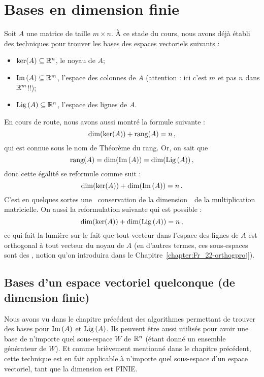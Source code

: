 \chapter{Bases en dimension finie}

\label{chapter:Fr_19-wrapupbases}

Soit $A$ une matrice de taille $m\times n$.
\`A ce stade du cours, nous avons déjà établi des techniques pour trouver les bases des espaces vectoriels suivants :
\begin{itemize}
\item $\ker(A)\subseteq \mathbb{R}^n$, le noyau de $A$;
\item $\operatorname{Im}\,(A)\subseteq \mathbb{R}^m$, l'espace des colonnes de $A$ (attention : ici c'est $m$ et pas $n$ dans $\mathbb{R}^m$!\!!);
\item $\operatorname{Lig\,}(A)\subseteq \mathbb{R}^n$, l'espace des lignes de $A$.
\end{itemize}
En cours de route, nous avons aussi montré la formule suivante : 
$$
\dim(\ker(A)) + \textrm{rang}(A) = n\,,
$$
qui est connue sous le nom de Théorème du rang.  Or, on sait que $$\textrm{rang}(A) = \dim(\operatorname{Im}\,(A)) = \dim(\operatorname{Lig\,}(A))\,,$$ donc cette égalité se reformule comme suit :
$$
\dim(\ker(A)) + \dim(\operatorname{Im}\,(A)) = n\,.  
$$
C'est en quelques sortes une \og\ conservation de la dimension\ \fg\ de la multiplication matricielle. On aussi la reformulation suivante qui est possible :
$$
 \dim(\ker(A)) + \dim(\operatorname{Lig\,}(A)) = n\,,
$$
ce qui fait la lumière sur le fait que tout vecteur dans l'espace des lignes de $A$ est orthogonal à tout vecteur du noyau de $A$ (en d'autres termes, ces sous-espaces sont des , notion qu'on introduira dans le Chapitre~\ref{chapter:Fr_22-orthogproj}).


\section{Bases d'un espace vectoriel quelconque (de dimension finie)}

Nous avons vu dans le chapitre pr\'ec\'edent des algorithmes permettant de trouver des bases pour $\operatorname{Im}\,(A)$ et $\operatorname{Lig\,}(A)$. Ils peuvent être aussi utilisés pour avoir  une base de n'importe quel sous-espace $W$ de $\mathbb{R}^n$ (étant donné un ensemble gén\'erateur de $W$).  Et comme brièvement mentionné dans le chapitre précédent, cette technique est en fait applicable à n'importe quel sous-espace d'un espace vectoriel, tant que la dimension est FINIE. \\

